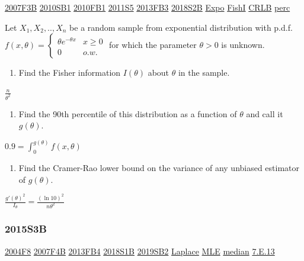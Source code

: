 \documentclass[10pt,twocolumn,portrait]{article}
\providecommand{\tightlist}{%
  \setlength{\itemsep}{0pt}\setlength{\parskip}{0pt}}
\begin{document}
\protect\hyperlink{f3b}{2007F3B} \protect\hyperlink{sb1-1}{2010SB1}
\protect\hyperlink{fb1-1}{2010FB1} \protect\hyperlink{s5-2}{2011S5}
\protect\hyperlink{fb3-2}{2013FB3} \protect\hyperlink{s2b-2}{2018S2B}
\protect\hyperlink{Expo}{Expo} \protect\hyperlink{section-5}{FishI}
\protect\hyperlink{section-5}{CRLB} \protect\hyperlink{perc}{perc}

Let \(X_1,X_2,..,X_n\) be a random sample from exponential distribution
with p.d.f.
\(f(x,\theta)=\begin{cases}\theta e^{-\theta x}& x\ge0\\0& o.w.\end{cases}\)
for which the parameter \(\theta>0\) is unknown.

\begin{enumerate}
\def\labelenumi{(\alph{enumi})}
\tightlist
\item
  Find the Fisher information \(I(\theta)\) about \(\theta\) in the
  sample.
\end{enumerate}

\(\frac{n}{\theta^2}\)

\begin{enumerate}
\def\labelenumi{(\alph{enumi})}
\setcounter{enumi}{1}
\tightlist
\item
  Find the 90th percentile of this distribution as a function of
  \(\theta\) and call it \(g(\theta)\).
\end{enumerate}

\(0.9=\int_0^{g(\theta)}f(x,\theta)\)

\begin{enumerate}
\def\labelenumi{(\alph{enumi})}
\setcounter{enumi}{2}
\tightlist
\item
  Find the Cramer-Rao lower bound on the variance of any unbiased
  estimator of \(g(\theta)\).
\end{enumerate}

\(\frac{g'(\theta)^2}{I_{\theta}}=\frac{(\ln10)^2}{n\theta^2}\)

\hypertarget{s3b-1}{%
\subsubsection{2015S3B}\label{s3b-1}}

\protect\hyperlink{f8-2}{2004F8} \protect\hyperlink{f4b}{2007F4B}
\protect\hyperlink{fb4-2}{2013FB4} \protect\hyperlink{s1b-2}{2018S1B}
\protect\hyperlink{sb2-3}{2019SB2} \protect\hyperlink{Laplace}{Laplace}
\protect\hyperlink{MLE}{MLE} \protect\hyperlink{median}{median}
\protect\hyperlink{e.13}{7.E.13}
\end{document}
